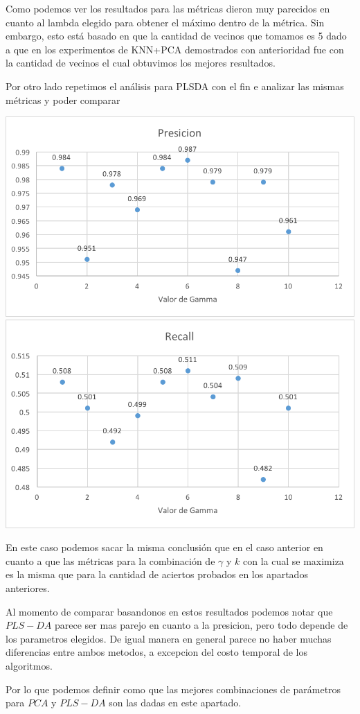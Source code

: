 Como podemos ver los resultados para las métricas dieron muy parecidos en cuanto al lambda elegido para obtener el máximo dentro de la métrica. Sin embargo, esto está basado en que la cantidad de vecinos que tomamos es 5 dado a que en los experimentos de KNN+PCA demostrados con anterioridad fue con la cantidad de vecinos el cual obtuvimos los mejores resultados.

Por otro lado repetimos el análisis para PLSDA con el fin e analizar las mismas métricas y poder comparar

\includegraphics[scale=1]{imagenes/plsdaPresicion.png}\\
\includegraphics[scale=1]{imagenes/plsdaRecall.png}

En este caso podemos sacar la misma conclusión que en el caso anterior en cuanto a que las métricas para la combinación de $\gamma$ y $k$ con la cual se maximiza es la misma que para la cantidad de aciertos probados en los apartados anteriores.

Al momento de comparar basandonos en estos resultados podemos notar que $PLS-DA$ parece ser mas parejo en cuanto a la presicion, pero todo depende de los parametros elegidos. De igual manera en general parece no haber muchas diferencias entre ambos metodos, a excepcion del costo temporal de los algoritmos.

Por lo que podemos definir como que las mejores combinaciones de parámetros para $PCA$ y $PLS-DA$ son las dadas en este apartado. 
